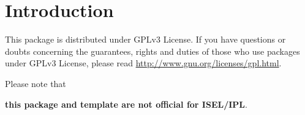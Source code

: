 % 
%
\chapter{Introduction}
\label{cha:introduction}

This package is distributed under GPLv3 License. If you have questions or  doubts concerning the guarantees, rights and duties of those who use packages under GPLv3 License, please read \url{http://www.gnu.org/licenses/gpl.html}.


Please note that 
\begin{center}
	\textbf{\large this package and template are not official for ISEL/IPL}.
\end{center}
